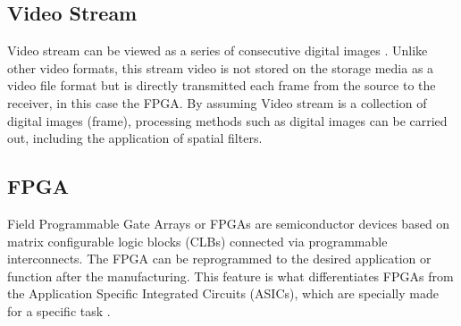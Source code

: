 \subsection{Video Stream}

Video stream can be viewed as a series of consecutive digital images \cite{thesis:jin}. Unlike other video formats, this stream video is not stored on the storage media as a video file format but is directly transmitted each frame from the source to the receiver, in this case the FPGA. By assuming Video stream is a collection of digital images (frame), processing methods such as digital images can be carried out, including the application of spatial filters.


\subsection{FPGA}

Field Programmable Gate Arrays or FPGAs are semiconductor devices based on matrix configurable logic blocks (CLBs) connected via programmable interconnects. The FPGA can be reprogrammed to the desired application or function after the manufacturing. This feature is what differentiates FPGAs from the Application Specific Integrated Circuits (ASICs), which are specially made for a specific task \cite{XILINX}.

